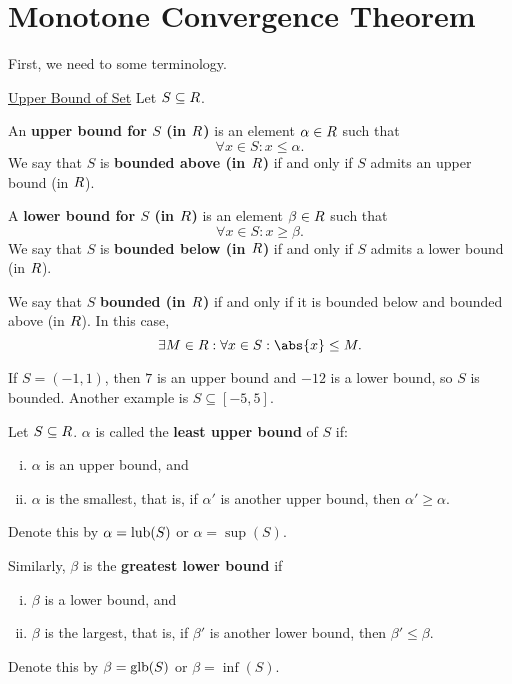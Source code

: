 \section{Monotone Convergence Theorem}
First, we need to some terminology.
\begin{Definition}{\href{https://proofwiki.org/wiki/Definition:Upper\_Bound\_of\_Set/Real\_Numbers}{Upper Bound of Set}}{}
    Let $ S\subseteq \relax{R} $.\smallskip

    An \textbf{upper bound for $S$ (in $ \relax{R} $)} is an element $ \alpha\in\relax{R} $ such that
    \[ \forall x\in S:x\le \alpha. \]
    We say that $ S $ is \textbf{bounded above (in $\relax{R}$)} if and only if $ S $ admits an upper bound (in $ \relax{R} $).\smallskip

    A \textbf{lower bound for $S$ (in $ \relax{R} $)} is an element $ \beta\in\relax{R} $ such that
    \[ \forall x\in S:x\ge \beta. \]
    We say that $ S $ is \textbf{bounded below (in $\relax{R}$)} if and only if $ S $ admits a lower bound (in $ \relax{R} $).\smallskip

    We say that $ S $ \textbf{bounded (in $ \relax{R} $)} if and only if it is bounded below and bounded
    above (in $ \relax{R} $). In this case,
    \[ \exists M\in\R:\forall x\in S:\abs{x}\le M. \]
\end{Definition}
\begin{Example}{}{}
    If $ S=(-1,1) $, then $ 7 $ is an upper bound and $ -12 $
    is a lower bound, so $ S $ is bounded. Another example
    is $ S\subseteq[-5,5] $.
\end{Example}
\begin{Definition}{}{}
    Let $ S\subseteq \relax{R} $. $ \alpha $ is called the \textbf{least upper bound}
    of $ S $ if:
    \begin{enumerate}[(i)]
        \item $ \alpha $ is an upper bound, and
        \item $ \alpha $ is the smallest, that is, if $ \alpha' $ is another
              upper bound, then $ \alpha'\ge \alpha $.
    \end{enumerate}
    Denote this by $ \alpha=\mathrm{lub}(S) $ or $ \alpha=\sup(S) $.

    Similarly, $ \beta $ is the \textbf{greatest lower bound} if
    \begin{enumerate}[(i)]
        \item $ \beta $ is a lower bound, and
        \item $ \beta $ is the largest, that is, if $ \beta' $
              is another lower bound, then $ \beta'\le \beta $.
    \end{enumerate}
    Denote this by $ \beta=\mathrm{glb}(S) $ or $ \beta=\inf(S) $.
\end{Definition}
